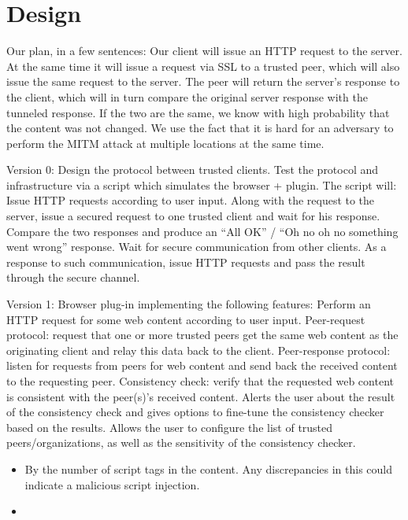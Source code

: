\section{Design}
\label{sec:design}

Our plan, in a few sentences:
Our client will issue an HTTP request to the server. At the same time it will issue a request via SSL to a trusted peer, which will also issue the same request to the server. The peer will return the server’s response to the client, which will in turn compare the original server response with the tunneled response. If the two are the same, we know with high probability that the content was not changed. We use the fact that it is hard for an adversary to perform the MITM attack at multiple locations at the same time.

Version 0:
Design the protocol between trusted clients.
Test the protocol and infrastructure via a script which simulates the browser + plugin. The script will:
Issue HTTP requests according to user input. Along with the request to the server, issue a secured request to one trusted client and wait for his response. Compare the two responses and produce an “All OK” / “Oh no oh no something went wrong” response.
Wait for secure communication from other clients. As a response to such communication, issue HTTP requests and pass the result through the secure channel.

Version 1:
Browser plug-in implementing the following features:
Perform an HTTP request for some web content according to user input.
Peer-request protocol: request that one or more trusted peers get the same web content as the originating client and relay this data back to the client.
Peer-response protocol: listen for requests from peers for web content and send back the received content to the requesting peer.
Consistency check: verify that the requested web content is consistent with the peer(s)’s received content.
Alerts the user about the result of the consistency check and gives options to fine-tune the consistency checker based on the results.
Allows the user to configure the list of trusted peers/organizations, as well as the sensitivity of the consistency checker.


\begin{itemize}
\item By the number of script tags in the content. Any discrepancies in this could indicate a malicious script injection.
\item 
\end{itemize}


